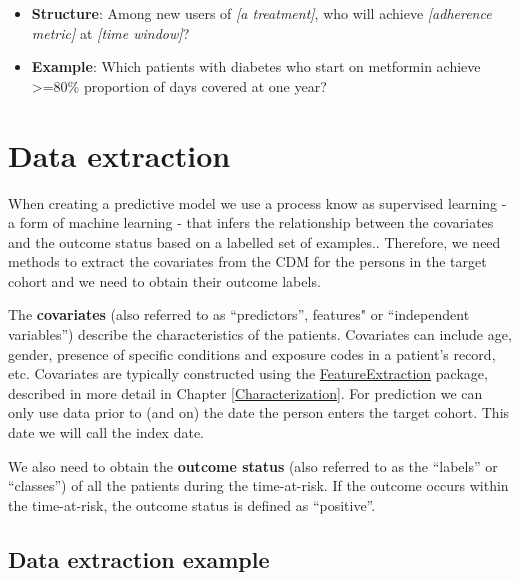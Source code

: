 \documentclass[11pt]{book}
\providecommand{\tightlist}{%
  \setlength{\itemsep}{0pt}\setlength{\parskip}{0pt}}
\theoremstyle{definition}
\theoremstyle{definition}
\theoremstyle{definition}
\theoremstyle{remark}
\begin{document}
\begin{itemize}
  \begin{itemize}
  \tightlist
  \item
    \textbf{Structure}: Among new users of \emph{{[}a treatment{]}}, who will achieve \emph{{[}adherence metric{]}} at \emph{{[}time window{]}}?
  \item
    \textbf{Example}: Which patients with diabetes who start on metformin achieve \textgreater=80\% proportion of days covered at one year?
  \end{itemize}
\end{itemize}

\hypertarget{data-extraction-2}{%
\section{Data extraction}\label{data-extraction-2}}

When creating a predictive model we use a process know as supervised learning - a form of machine learning - that infers the relationship between the covariates and the outcome status based on a labelled set of examples.. Therefore, we need methods to extract the covariates from the CDM for the persons in the target cohort and we need to obtain their outcome labels.

The \textbf{covariates} (also referred to as ``predictors'', features" or ``independent variables'') describe the characteristics of the patients. Covariates can include age, gender, presence of specific conditions and exposure codes in a patient's record, etc. Covariates are typically constructed using the \href{https://ohdsi.github.io/FeatureExtraction/}{FeatureExtraction} package, described in more detail in Chapter \ref{Characterization}. For prediction we can only use data prior to (and on) the date the person enters the target cohort. This date we will call the index date.

We also need to obtain the \textbf{outcome status} (also referred to as the ``labels'' or ``classes'') of all the patients during the time-at-risk. If the outcome occurs within the time-at-risk, the outcome status is defined as ``positive''.   

\hypertarget{data-extraction-example}{%
\subsection{Data extraction example}\label{data-extraction-example}}
\end{document}
